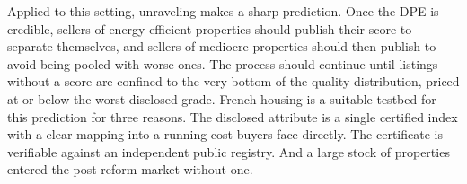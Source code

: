 Applied to this setting, unraveling makes a sharp prediction. Once the DPE is credible, sellers
of energy-efficient properties should publish their score to separate themselves, and sellers of
mediocre properties should then publish to avoid being pooled with worse ones. The process
should continue until listings without a score are confined to the very bottom of the quality
distribution, priced at or below the worst disclosed grade. French housing is a suitable
testbed for this prediction for three reasons. The disclosed attribute is a single certified index with a
clear mapping into a running cost buyers face directly. The certificate is verifiable
against an independent public registry. And a large stock of properties entered the
post-reform market without one.
